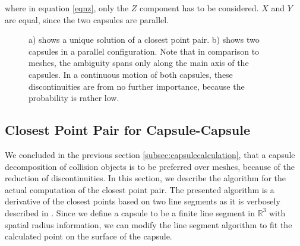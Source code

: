 where in equation \ref{eqnz}, only the $Z$ component has to be considered. $X$ and $Y$ are equal, since the two capsules are parallel.
\begin{figure}[h!]
\centering     %
{}
\caption{a) shows a unique solution of a closest point pair. b) shows two capsules in a parallel configuration. Note that in comparison to meshes, the ambiguity spans only along the main axis of the capsules. In a continuous motion of both capsules, these discontinuities are from no further importance, because the probability is rather low.} 
\label{capsulecapsule}
\end{figure}

\subsection{Closest Point Pair for Capsule-Capsule}
We concluded in the previous section \ref{subsec:capsulecalculation}, that a capsule decomposition of collision objects is to be preferred over meshes, because of the reduction of discontinuities. In this section, we describe the algorithm for the actual computation of the closest point pair. The presented algorithm is a derivative of the closest points based on two line segments as it is verbosely described in \cite{Ericson:2004:RCD:1121584}. Since we define a capsule to be a finite line segment in $\mathbb{R}^3$ with spatial radius information, we can modify the line segment algorithm to fit the calculated point on the surface of the capsule.

